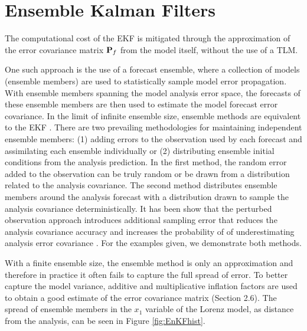 \documentclass[12pt]{report}
\begin{document}
\section{Ensemble Kalman Filters}

The computational cost of the EKF is mitigated through the approximation of the error covariance matrix $\mathbf{P}_f$ from the model itself, without the use of a TLM.

One such approach is the use of a forecast ensemble, where a collection of models (ensemble members) are used to statistically sample model error propagation.
With ensemble members spanning the model analysis error space, the forecasts of these ensemble members are then used to estimate the model forecast error covariance.
In the limit of infinite ensemble size, ensemble methods are equivalent to the EKF .
There are two prevailing methodologies for maintaining independent ensemble members: (1) adding errors to the observation used by each forecast and assimilating each ensemble individually or (2) distributing ensemble initial conditions from the analysis prediction.
In the first method, the random error added to the observation can be truly random  or be drawn from a distribution related to the analysis covariance.
The second method distributes ensemble members around the analysis forecast with a distribution drawn to sample the analysis covariance deterministically.
It has been show that the perturbed observation approach introduces additional sampling error that reduces the analysis covariance accuracy and increases the probability of of underestimating analysis error covariance .
For the examples given, we demonstrate both methods.

With a finite ensemble size, the ensemble method is only an approximation and therefore in practice it often fails to capture the full spread of error.
To better capture the model variance, additive and multiplicative inflation factors are used to obtain a good estimate of the error covariance matrix (Section 2.6).
The spread of ensemble members in the $x_1$ variable of the Lorenz model, as distance from the analysis, can be seen in Figure \ref{fig:EnKFhist}.
\end{document}
